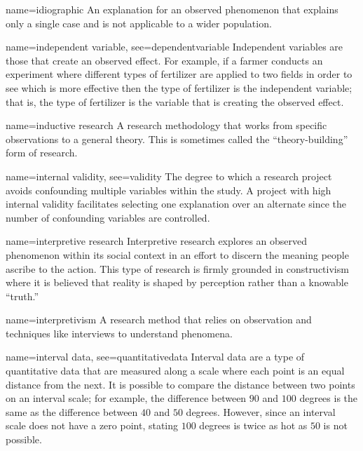 {name={idiographic}}
{%
	An explanation for an observed phenomenon that explains only a single case and is not applicable to a wider population.
}

{name={independent variable},
	see={dependentvariable}}
{%
	Independent variables are those that create an observed effect. For example, if a farmer conducts an experiment where different types of fertilizer are applied to two fields in order to see which is more effective then the type of fertilizer is the independent variable; that is, the type of fertilizer is the variable that is creating the observed effect.
}

{name={inductive research}}
{%
	A research methodology that works from specific observations to a general theory. This is sometimes called the ``theory-building'' form of research.
}

{name={internal validity},
	see={validity}}
{%
	The degree to which a research project avoids confounding multiple variables within the study. A project with high internal validity facilitates selecting one explanation over an alternate since the number of confounding variables are controlled.
}

{name={interpretive research}}
{%
	Interpretive research explores an observed phenomenon within its social context in an effort to discern the meaning people ascribe to the action. This type of research is firmly grounded in constructivism where it is believed that reality is shaped by perception rather than a knowable ``truth.'' 
}

{name={interpretivism}}
{%
	A research method that relies on observation and techniques like interviews to understand phenomena. 
}

{name={interval data},
	see={quantitativedata}}
{%
	Interval data are a type of quantitative data that are measured along a scale where each point is an equal distance from the next. It is possible to compare the distance between two points on an interval scale; for example, the difference between $ 90 $ and $ 100 $ degrees is the same as the difference between $ 40 $ and $ 50 $ degrees. However, since an interval scale does not have a zero point, stating $ 100 $ degrees is twice as hot as $ 50 $ is not possible. 
}


